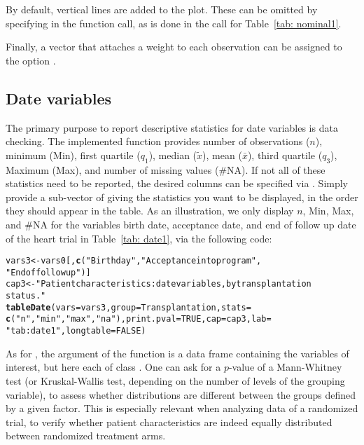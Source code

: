 \documentclass[nojss]{jss}\usepackage[]{graphicx}\usepackage[]{color}
\makeatletter
\newcommand{\hlnum}[1]{\textcolor[rgb]{0.686,0.059,0.569}{#1}}%
\newcommand{\hlstr}[1]{\textcolor[rgb]{0.192,0.494,0.8}{#1}}%
\newcommand{\hlstd}[1]{\textcolor[rgb]{0.345,0.345,0.345}{#1}}%
\newcommand{\hlkwb}[1]{\textcolor[rgb]{0.69,0.353,0.396}{#1}}%
\newcommand{\hlkwc}[1]{\textcolor[rgb]{0.333,0.667,0.333}{#1}}%
\newcommand{\hlkwd}[1]{\textcolor[rgb]{0.737,0.353,0.396}{\textbf{#1}}}%
\newenvironment{kframe}{%
 \def\at@end@of@kframe{}%
 \ifinner\ifhmode%
  \def\at@end@of@kframe{\end{minipage}}%
  \begin{minipage}{\columnwidth}%
 \fi\fi%
 \def\FrameCommand##1{\hskip\@totalleftmargin \hskip-\fboxsep
 \colorbox{shadecolor}{##1}\hskip-\fboxsep
     \hskip-\linewidth \hskip-\@totalleftmargin \hskip\columnwidth}%
 \MakeFramed {\advance\hsize-\width
   \@totalleftmargin\z@ \linewidth\hsize
   \@setminipage}}%
 {\par\unskip\endMakeFramed%
 \at@end@of@kframe}
\newenvironment{knitrout}{}{} %
\makeatother
\begin{document}
By default, vertical lines are added to the plot. 
These can be omitted by specifying  in the function call, as is done in the call for 
Table~\ref{tab: nominal1}.

Finally, a vector that attaches a weight to each observation can be assigned to the option .

\subsection{Date variables}
The primary purpose to report descriptive statistics for date variables is data checking. The implemented function
 provides number of observations ($n$), minimum (Min), first quartile ($q_1$), median ($\widetilde{x}$), mean ($\bar{x}$), third quartile ($q_3$),
Maximum (Max), and number of missing values ($\#$NA).
If not all of these statistics need to be reported, the desired columns can be specified via .
Simply provide a sub-vector of  giving the statistics 
you want to be displayed, in the order they should appear in the table.
As an illustration, we only display $n$, Min, Max, and $\#$NA for the variables birth date, acceptance date,
and end of follow up date of the heart trial in Table~\ref{tab: date1}, via the following code:

\begin{knitrout}\footnotesize
{}\color{fgcolor}\begin{kframe}
\begin{alltt}
\hlstd{vars3} \hlkwb{<-} \hlstd{vars0[,} \hlkwd{c}\hlstd{(}\hlstr{"Birthday"}\hlstd{,} \hlstr{"Acceptance into program"}\hlstd{,}
  \hlstr{"End of follow up"}\hlstd{)]}
\hlstd{cap3} \hlkwb{<-} \hlstr{"Patient characteristics: date variables, by transplantation 
  status."}
\hlkwd{tableDate}\hlstd{(}\hlkwc{vars} \hlstd{= vars3,} \hlkwc{group} \hlstd{= Transplantation,} \hlkwc{stats} \hlstd{=}
  \hlkwd{c}\hlstd{(}\hlstr{"n"}\hlstd{,} \hlstr{"min"}\hlstd{,} \hlstr{"max"}\hlstd{,} \hlstr{"na"}\hlstd{),} \hlkwc{print.pval} \hlstd{=} \hlnum{TRUE}\hlstd{,} \hlkwc{cap} \hlstd{= cap3,} \hlkwc{lab} \hlstd{=}
  \hlstr{"tab: date1"}\hlstd{,} \hlkwc{longtable} \hlstd{=} \hlnum{FALSE}\hlstd{)}
\end{alltt}
\end{kframe}
\end{knitrout}
 
As for , the  argument of the function is a data frame containing the variables of interest,
but here each of  class .
One can ask for a $p$-value of a Mann-Whitney test (or Kruskal-Wallis test, 
depending on the number of levels of the grouping variable), to assess whether distributions are different
between the groups defined by a given factor. This is especially relevant when analyzing data of a 
randomized trial, to verify whether patient 
characteristics are indeed equally distributed between randomized treatment arms. 
\end{document}
